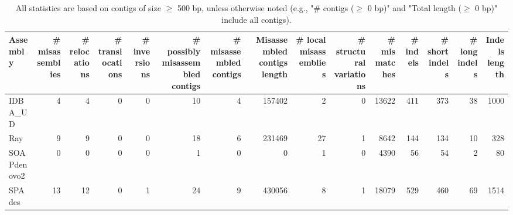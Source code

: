 \documentclass[12pt,a4paper]{article}
\begin{document}
\begin{table}[ht]
\begin{center}
\caption{All statistics are based on contigs of size $\geq$ 500 bp, unless otherwise noted (e.g., "\# contigs ($\geq$ 0 bp)" and "Total length ($\geq$ 0 bp)" include all contigs).}
\begin{tabular}{|l*{14}{|r}|}
\hline
Assembly & \# misassemblies &     \# relocations &     \# translocations &     \# inversions & \# possibly misassembled contigs & \# misassembled contigs & Misassembled contigs length & \# local misassemblies & \# structural variations & \# mismatches & \# indels &     \# short indels &     \# long indels & Indels length \\ \hline
IDBA\_UD & 4 & 4 & 0 & 0 & 10 & 4 & 157402 & 2 & 0 & 13622 & 411 & 373 & 38 & 1000 \\ \hline
Ray & 9 & 9 & 0 & 0 & 18 & 6 & 231469 & 27 & 1 & 8642 & 144 & 134 & 10 & 328 \\ \hline
SOAPdenovo2 & 0 & 0 & 0 & 0 & 1 & 0 & 0 & 1 & 0 & 4390 & 56 & 54 & 2 & 80 \\ \hline
SPAdes & 13 & 12 & 0 & 1 & 24 & 9 & 430056 & 8 & 1 & 18079 & 529 & 460 & 69 & 1514 \\ \hline
\end{tabular}
\end{center}
\end{table}
\end{document}
